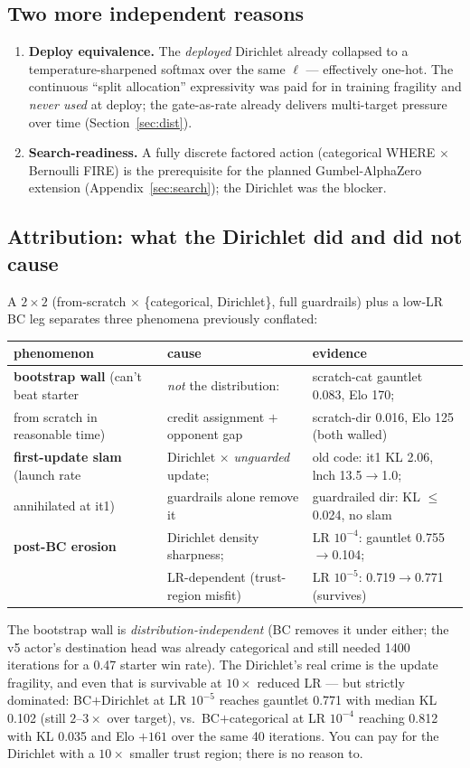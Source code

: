 \documentclass[11pt]{article}
\begin{document}
\subsection{Two more independent reasons}
\begin{enumerate}[nosep,leftmargin=1.8em]
\item \textbf{Deploy equivalence.} The \emph{deployed} Dirichlet already collapsed to a
  temperature-sharpened softmax over the same $\ell$ --- effectively one-hot. The continuous
  ``split allocation'' expressivity was paid for in training fragility and \emph{never used} at deploy;
  the gate-as-rate already delivers multi-target pressure over time (Section~\ref{sec:dist}).
\item \textbf{Search-readiness.} A fully discrete factored action (categorical WHERE $\times$ Bernoulli
  FIRE) is the prerequisite for the planned Gumbel-AlphaZero extension (Appendix~\ref{sec:search}); the
  Dirichlet was the blocker.
\end{enumerate}

\subsection{Attribution: what the Dirichlet did and did not cause}
A $2{\times}2$ (from-scratch $\times$ \{categorical, Dirichlet\}, full guardrails) plus a low-LR BC leg
separates three phenomena previously conflated:
\begin{center}\small
\begin{tabular}{@{}lll@{}}
\toprule
phenomenon & cause & evidence \\
\midrule
\textbf{bootstrap wall} (can't beat starter & \emph{not} the distribution: & scratch-cat gauntlet 0.083, Elo 170; \\
\quad from scratch in reasonable time) & credit assignment $+$ opponent gap & scratch-dir 0.016, Elo 125 (both walled) \\
\textbf{first-update slam} (launch rate & Dirichlet $\times$ \emph{unguarded} update; & old code: it1 KL 2.06, lnch 13.5$\to$1.0; \\
\quad annihilated at it1) & guardrails alone remove it & guardrailed dir: KL $\le$0.024, no slam \\
\textbf{post-BC erosion} & Dirichlet density sharpness; & LR $10^{-4}$: gauntlet 0.755$\to$0.104; \\
 & LR-dependent (trust-region misfit) & LR $10^{-5}$: 0.719$\to$0.771 (survives) \\
\bottomrule
\end{tabular}
\end{center}
The bootstrap wall is \emph{distribution-independent} (BC removes it under either; the v5 actor's
destination head was already categorical and still needed 1400 iterations for a 0.47 starter win rate).
The Dirichlet's real crime is the update fragility, and even that is survivable at $10\times$ reduced LR
--- but strictly dominated: BC$+$Dirichlet at LR $10^{-5}$ reaches gauntlet 0.771 with median KL 0.102
(still $2$--$3\times$ over target), vs.\ BC$+$categorical at LR $10^{-4}$ reaching 0.812 with KL 0.035 and
Elo $+161$ over the same 40 iterations. You can pay for the Dirichlet with a $10\times$ smaller trust
region; there is no reason to.
\end{document}

